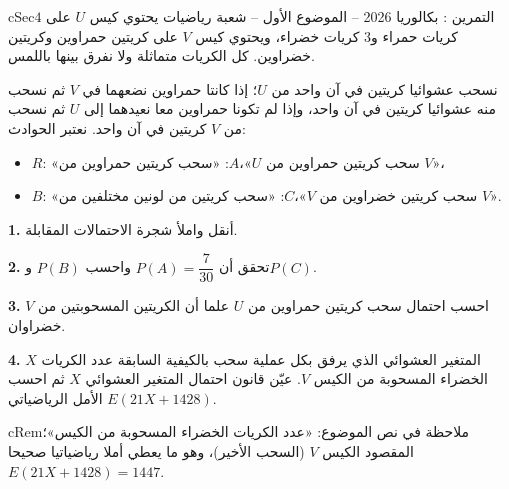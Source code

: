 \documentclass[12pt,a4paper]{article}
\newenvironment{BOX}[2]{\begin{otherlanguage}{english}\begin{arbox}{#1}{#2}}{\end{arbox}\end{otherlanguage}}
\newenvironment{molahada}[1][ملاحظة]{\begin{BOX}{cRem}{#1}}{\end{BOX}}
\newcounter{exo}
\newenvironment{tamrin}[1]{\stepcounter{exo}\begin{BOX}{cSec}{التمرين \theexo: #1}}{\end{BOX}}
\newenvironment{LTR}{\begin{otherlanguage}{english}}{\end{otherlanguage}}
\renewcommand{\ldots}{\mathinner{\ldotp\ldotp\ldotp}}
\newcommand{\QQ}[1]{\par\smallskip\textbf{#1.} }
\begin{document}
\begin{tamrin}{بكالوريا 2026 -- الموضوع الأول -- شعبة رياضيات}
يحتوي كيس $U$ على $4$ كريات حمراء و$3$ كريات خضراء، ويحتوي كيس $V$ على كريتين حمراوين وكريتين خضراوين.
كل الكريات متماثلة ولا نفرق بينها باللمس.

نسحب عشوائيا كريتين في آن واحد من $U$؛ إذا كانتا حمراوين نضعهما في $V$ ثم نسحب منه عشوائيا كريتين في آن واحد، وإذا لم تكونا حمراوين معا نعيدهما إلى $U$ ثم نسحب من $V$ كريتين في آن واحد. نعتبر الحوادث:
\begin{itemize}
\item $R$: «سحب كريتين حمراوين من $U$»،\quad $A$: «سحب كريتين حمراوين من $V$»،
\item $B$: «سحب كريتين خضراوين من $V$»،\quad $C$: «سحب كريتين من لونين مختلفين من $V$».
\end{itemize}
\begin{center}\begin{LTR}\end{LTR}\end{center}
\QQ{1} أنقل واملأ شجرة الاحتمالات المقابلة.
\QQ{2} تحقق أن $P(A)=\dfrac{7}{30}$ واحسب $P(B)$ و$P(C)$.
\QQ{3} احسب احتمال سحب كريتين حمراوين من $U$ علما أن الكريتين المسحوبتين من $V$ خضراوان.
\QQ{4} $X$ المتغير العشوائي الذي يرفق بكل عملية سحب بالكيفية السابقة عدد الكريات الخضراء المسحوبة من الكيس $V$.
عيّن قانون احتمال المتغير العشوائي $X$ ثم احسب الأمل الرياضياتي $E(21X+1428)$.
\end{tamrin}
\begin{molahada}
في نص الموضوع: «عدد الكريات الخضراء المسحوبة من الكيس»؛ المقصود الكيس $V$ (السحب الأخير)، وهو ما يعطي أملا رياضياتيا صحيحا $E(21X+1428)=1447$.
\end{molahada}
\end{document}

